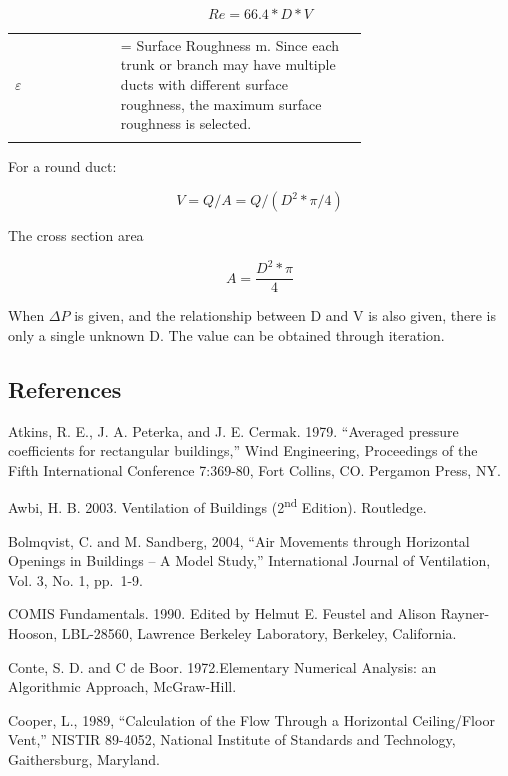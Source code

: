 \begin{equation}
Re = 66.4 *D *V
\end{equation}

\begin{tabular}{lp{0.7\linewidth}}
\\
 $\varepsilon$ &= Surface Roughness {m}. Since each trunk or branch may have multiple ducts with different surface roughness, the maximum surface roughness is selected.\\
\\
\end{tabular}

For a round duct:

\begin{equation}
V = Q/A = Q / (D^2 * \pi / 4)
\end{equation}

The cross section area

\begin{equation}
A = \frac{D^2 * \pi}{4}
\end{equation}

When \(\Delta P\) is given, and the relationship between D and V is also given, there is only a single unknown D. The value can be obtained through iteration.

\subsection{References}\label{afn-references}

Atkins, R. E., J. A. Peterka, and J. E. Cermak. 1979. ``Averaged pressure coefficients for rectangular buildings,'' Wind Engineering, Proceedings of the Fifth International Conference 7:369-80, Fort Collins, CO. Pergamon Press, NY.

Awbi, H. B. 2003. Ventilation of Buildings (2\textsuperscript{nd} Edition). Routledge.

Bolmqvist, C. and M. Sandberg, 2004, ``Air Movements through Horizontal Openings in Buildings -- A Model Study,'' International Journal of Ventilation, Vol. 3, No. 1, pp.~1-9.

COMIS Fundamentals. 1990. Edited by Helmut E. Feustel and Alison Rayner-Hooson, LBL-28560, Lawrence Berkeley Laboratory, Berkeley, California.

Conte, S. D. and C de Boor. 1972.Elementary Numerical Analysis: an Algorithmic Approach, McGraw-Hill.

Cooper, L., 1989, ``Calculation of the Flow Through a Horizontal Ceiling/Floor Vent,'' NISTIR 89-4052, National Institute of Standards and Technology, Gaithersburg, Maryland.


